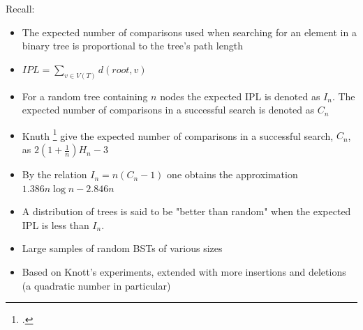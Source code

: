 \documentclass{beamer}
\begin{document}
\begin{frame}
    Recall:
    \begin{itemize}
        \item The expected number of comparisons used when searching for an element in a binary tree is proportional to the tree's path length
            \pause
        \item $IPL = \sum\limits_{v \in V(T)} d(root, v)$
            \pause
        \item For a random tree containing $n$ nodes the expected IPL is denoted as $I_n$. The expected number of comparisons in a successful search is denoted as $C_n$
        \item Knuth \footcite{knuth1998art} give the expected number of comparisons in a successful search, $C_n$, as $2(1 + \frac{1}{n})H_n - 3$
        \item By the relation $I_n = n(C_n - 1)$ one obtains the approximation $1.386n \log n - 2.846n$
            \pause
        \item A distribution of trees is said to be "better than random" when the expected IPL is less than $I_n$.
    \end{itemize}
\end{frame}

\begin{frame}
    \begin{itemize}
        \item Large samples of random BSTs of various sizes
        \item Based on Knott's experiments, extended with more insertions and deletions (a quadratic number in particular)
    \end{itemize}
\end{frame}
\end{document}
